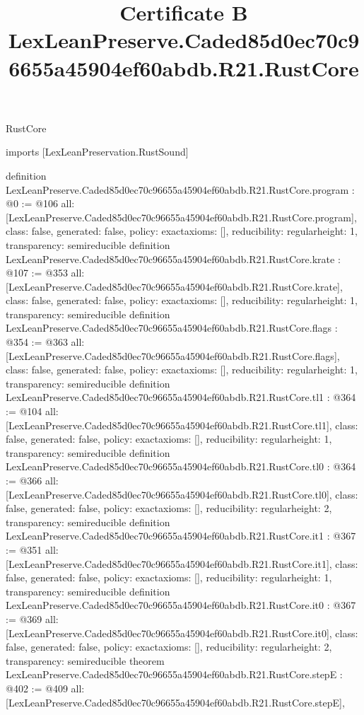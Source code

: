 \begin{lexlean}{RustCore}
\title{Certificate B LexLeanPreserve.Caded85d0ec70c96655a45904ef60abdb.R21.RustCore}
\begin{coremodule}
imports [LexLeanPreservation.RustSound]

definition LexLeanPreserve.Caded85d0ec70c96655a45904ef60abdb.R21.RustCore.program : @0 := @106 {
  all: [LexLeanPreserve.Caded85d0ec70c96655a45904ef60abdb.R21.RustCore.program],
  class: false,
  generated: false,
  policy: exact{axioms: []},
  reducibility: regular{height: 1},
  transparency: semireducible
}
definition LexLeanPreserve.Caded85d0ec70c96655a45904ef60abdb.R21.RustCore.krate : @107 := @353 {
  all: [LexLeanPreserve.Caded85d0ec70c96655a45904ef60abdb.R21.RustCore.krate],
  class: false,
  generated: false,
  policy: exact{axioms: []},
  reducibility: regular{height: 1},
  transparency: semireducible
}
definition LexLeanPreserve.Caded85d0ec70c96655a45904ef60abdb.R21.RustCore.flags : @354 := @363 {
  all: [LexLeanPreserve.Caded85d0ec70c96655a45904ef60abdb.R21.RustCore.flags],
  class: false,
  generated: false,
  policy: exact{axioms: []},
  reducibility: regular{height: 1},
  transparency: semireducible
}
definition LexLeanPreserve.Caded85d0ec70c96655a45904ef60abdb.R21.RustCore.tl1 : @364 := @104 {
  all: [LexLeanPreserve.Caded85d0ec70c96655a45904ef60abdb.R21.RustCore.tl1],
  class: false,
  generated: false,
  policy: exact{axioms: []},
  reducibility: regular{height: 1},
  transparency: semireducible
}
definition LexLeanPreserve.Caded85d0ec70c96655a45904ef60abdb.R21.RustCore.tl0 : @364 := @366 {
  all: [LexLeanPreserve.Caded85d0ec70c96655a45904ef60abdb.R21.RustCore.tl0],
  class: false,
  generated: false,
  policy: exact{axioms: []},
  reducibility: regular{height: 2},
  transparency: semireducible
}
definition LexLeanPreserve.Caded85d0ec70c96655a45904ef60abdb.R21.RustCore.it1 : @367 := @351 {
  all: [LexLeanPreserve.Caded85d0ec70c96655a45904ef60abdb.R21.RustCore.it1],
  class: false,
  generated: false,
  policy: exact{axioms: []},
  reducibility: regular{height: 1},
  transparency: semireducible
}
definition LexLeanPreserve.Caded85d0ec70c96655a45904ef60abdb.R21.RustCore.it0 : @367 := @369 {
  all: [LexLeanPreserve.Caded85d0ec70c96655a45904ef60abdb.R21.RustCore.it0],
  class: false,
  generated: false,
  policy: exact{axioms: []},
  reducibility: regular{height: 2},
  transparency: semireducible
}
theorem LexLeanPreserve.Caded85d0ec70c96655a45904ef60abdb.R21.RustCore.stepE : @402 := @409 {
  all: [LexLeanPreserve.Caded85d0ec70c96655a45904ef60abdb.R21.RustCore.stepE],
}
\end{coremodule}
\end{lexlean}
